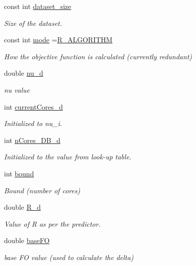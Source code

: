 \begin{DoxyCompactItemize}
const int \hyperlink{classApplication_a83bcec93383a2816d9bbaa51b7dfa0c6}{dataset\-\_\-size}
\begin{DoxyCompactList}\small\item\em Size of the dataset. \end{DoxyCompactList}\item 
const int \hyperlink{classApplication_a351cf2c8500b5b5520aeeac8f53c7f74}{mode} =\hyperlink{application_8hh_aaeed326368abd712225f9ca34c338fbf}{R\-\_\-\-A\-L\-G\-O\-R\-I\-T\-H\-M}
\begin{DoxyCompactList}\small\item\em How the objective function is calculated (currently redundant) \end{DoxyCompactList}\item 
double \hyperlink{classApplication_a42c22b9a3130cf1f2722ce222f2e5bae}{nu\-\_\-d}
\begin{DoxyCompactList}\small\item\em nu value \end{DoxyCompactList}\item 
int \hyperlink{classApplication_adee341a84a5389dfd4d16e7f8e697190}{current\-Cores\-\_\-d}
\begin{DoxyCompactList}\small\item\em Initialized to nu\-\_\-i. \end{DoxyCompactList}\item 
int \hyperlink{classApplication_a95104d330c9c7ed2c1017b4938a39a9a}{n\-Cores\-\_\-\-D\-B\-\_\-d}
\begin{DoxyCompactList}\small\item\em Initialized to the value from look-\/up table. \end{DoxyCompactList}\item 
int \hyperlink{classApplication_a6e91bef9d503af0e8ba38c8f445c8cb0}{bound}
\begin{DoxyCompactList}\small\item\em Bound (number of cores) \end{DoxyCompactList}\item 
double \hyperlink{classApplication_a374d43f68ae27aaed98278e8152a434c}{R\-\_\-d}
\begin{DoxyCompactList}\small\item\em Value of R as per the predictor. \end{DoxyCompactList}\item 
double \hyperlink{classApplication_aa703e7525d446d98b5cd51c959d35998}{base\-F\-O}
\begin{DoxyCompactList}\small\item\em base F\-O value (used to calculate the delta) \end{DoxyCompactList}\item 

\end{DoxyCompactItemize}
